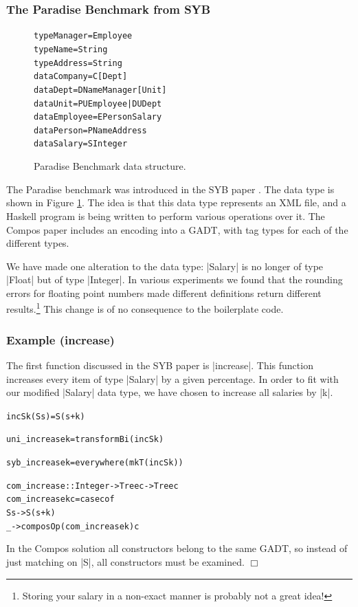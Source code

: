 \documentclass[preprint]{sigplanconf}
\newcounter{exmp}
\newcommand{\noexample}{\hfill$\Box$}
\newenvironment{code}{\begin{alltt}\small}{\end{alltt}}
\newenvironment{examplename}[1]
    {\refstepcounter{exmp}\subsubsection*{Example \arabic{exmp} (#1)}}
    {\noexample}
\newcommand{\ignore}{}
\newcommand{\figureend}{\vspace{-4mm}}
\begin{document}
\subsubsection{The Paradise Benchmark from SYB}

\begin{figure}
\begin{code}
type  Manager   = Employee
type  Name      = String
type  Address   = String
data  Company   = C [Dept]
data  Dept      = D Name Manager [Unit]
data  Unit      = PU Employee | DU Dept
data  Employee  = E Person Salary
data  Person    = P Name Address
data  Salary    = S Integer
\end{code}
\caption{Paradise Benchmark data structure.}
\label{fig:paradise}
\figureend
\end{figure}

The Paradise benchmark was introduced in the SYB paper \citep{lammel:syb}. The data type is shown in Figure \ref{fig:paradise}. The idea is that this data type represents an XML file, and a Haskell program is being written to perform various operations over it. The Compos paper includes an encoding into a GADT, with tag types for each of the different types.

We have made one alteration to the data type: |Salary| is no longer of type |Float| but of type |Integer|. In various experiments we found that the rounding errors for floating point numbers made different definitions return different results.\footnote{Storing your salary in a non-exact manner is probably not a great idea!} This change is of no consequence to the boilerplate code.

\begin{examplename}{increase}

The first function discussed in the SYB paper is |increase|. This function increases every item of type |Salary| by a given percentage. In order to fit with our modified |Salary| data type, we have chosen to increase all salaries by |k|.

\ignore\begin{code}
incS k (S s) = S (s + k)

uni_increase k = transformBi (incS k)

syb_increase k = everywhere (mkT (incS k))

com_increase :: Integer -> Tree c -> Tree c
com_increase k c = case c of
    S s -> S (s + k)
    _ -> composOp (com_increase k) c
\end{code}

In the Compos solution all constructors belong to the same GADT, so instead of just matching on |S|, all constructors must be examined.
\end{examplename}
\end{document}
